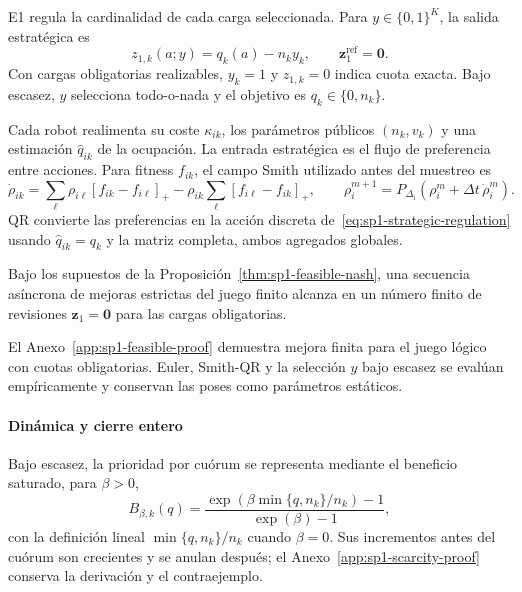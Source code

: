 E1 regula la cardinalidad de cada carga seleccionada. Para \(y\in\{0,1\}^K\), la salida estratégica es
\begin{equation}
 z_{1,k}(a;y)=q_k(a)-n_ky_k,
 \qquad \boldsymbol z_1^{\mathrm{ref}}=\boldsymbol0.
 \label{eq:sp1-strategic-regulation}
\end{equation}
Con cargas obligatorias realizables, $y_k=1$ y $z_{1,k}=0$ indica cuota exacta. Bajo escasez, $y$ selecciona todo-o-nada y el objetivo es $q_k\in\{0,n_k\}$.

Cada robot realimenta su coste $\kappa_{ik}$, los parámetros públicos $(n_k,v_k)$ y una estimación $\widehat q_{ik}$ de la ocupación. La entrada estratégica es el flujo de preferencia entre acciones. Para fitness $f_{ik}$, el campo Smith utilizado antes del muestreo es
\begin{equation}
 \dot\rho_{ik}=
 \sum_{\ell}\rho_{i\ell}[f_{ik}-f_{i\ell}]_+
 -\rho_{ik}\sum_{\ell}[f_{i\ell}-f_{ik}]_+,
 \qquad
 \rho_i^{m+1}=P_{\Delta_i}\!\left(\rho_i^m+\Delta t\,\dot\rho_i^m\right).
 \label{eq:sp1-smith-feedback}
\end{equation}
QR convierte las preferencias en la acción discreta de~\eqref{eq:sp1-strategic-regulation} usando \(\widehat q_{ik}=q_k\) y la matriz completa, ambos agregados globales.

\begin{corolario}
\label{cor:sp1-strategic-regulation}
Bajo los supuestos de la Proposición~\ref{thm:sp1-feasible-nash}, una secuencia asíncrona de mejoras estrictas del juego finito alcanza en un número finito de revisiones $\boldsymbol z_1=\boldsymbol0$ para las cargas obligatorias.
\end{corolario}
El Anexo~\ref{app:sp1-feasible-proof} demuestra mejora finita para el juego lógico con cuotas obligatorias. Euler, Smith-QR y la selección \(y\) bajo escasez se evalúan empíricamente y conservan las poses como parámetros estáticos.
\fi

\paragraph{Dinámica y cierre entero}

Bajo escasez, la prioridad por cuórum se representa mediante el beneficio saturado, para $\beta>0$,
\begin{equation}
 B_{\beta,k}(q)=\frac{\exp\!\left(\beta\min\{q,n_k\}/n_k\right)-1}{\exp(\beta)-1},
 \label{eq:sp1-quorum-benefit}
\end{equation}
con la definición lineal $\min\{q,n_k\}/n_k$ cuando $\beta=0$. Sus incrementos antes del cuórum son crecientes y se anulan después; el Anexo~\ref{app:sp1-scarcity-proof} conserva la derivación y el contraejemplo.

